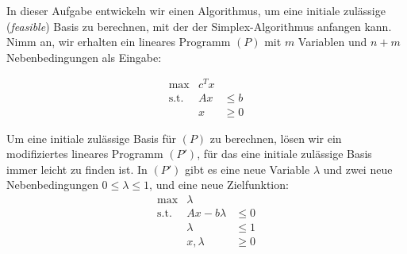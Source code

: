 \documentclass{uebung_cs}
\begin{document}
\vspace{-0.5cm}
\begin{exercise}
%
%
%
%
	In dieser Aufgabe entwickeln wir einen Algorithmus, um eine initiale zulässige (\textit{feasible}) Basis zu berechnen, mit der der Simplex-Algorithmus anfangen kann. Nimm an, wir erhalten ein lineares Programm $(P)$ mit $m$ Variablen und $n + m$ Nebenbedingungen als Eingabe:
	
	\[
		\begin{array}{rrl}
			\text{max}   &  c^T x &  	    \\
			\text{s.t.}  &	Ax & \leq b \\
						 &	x  & \geq 0
		\end{array}
	\]
	
	Um eine initiale zulässige Basis für $(P)$ zu berechnen, lösen wir ein modifiziertes lineares Programm $(P')$, für das eine initiale zulässige Basis immer leicht zu finden ist. In $(P')$ gibt es eine neue Variable $\lambda$ und zwei neue Nebenbedingungen $0 \leq \lambda \leq 1$, und eine neue Zielfunktion:
	\[
		\begin{array}{rrl}
			\text{max}   &        \lambda & 	   \\
			\text{s.t.}  &	Ax - b\lambda & \leq 0 \\
						 &		  \lambda & \leq 1 \\
						 &	 x, \lambda   & \geq 0
		\end{array}
	\]
	

\end{exercise}
\end{document}
